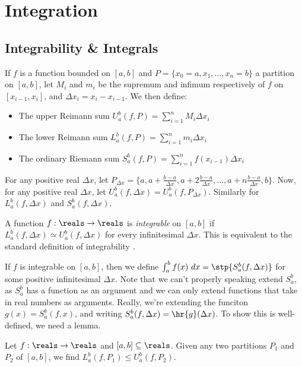 \section{Integration}


\subsection{Integrability \& Integrals}
If $f$ is a function bounded on $[a, b]$ and $P = \{x_0 = a, x_1, \ldots, x_n = b\}$ a partition on $[a, b]$, let $M_i$ and $m_i$ be the supremum and infimum respectively of $f$ on $[x_{i-1}, x_i]$, and $\Delta x_i = x_i - x_{i-1}$. We then define:
\begin{itemize}
    \item The upper Reimann sum $U_a^b(f, P) = \sum_{i=1}^n M_i\Delta x_i$
    \item The lower Reimann sum $L_a^b(f, P) =\sum_{i=1}^n m_i\Delta x_i$
    \item The ordinary Riemann sum $S_a^b(f, P) = \sum_{i=1}^n f(x_{i-1})\Delta x_i$
\end{itemize}
For any positive real $\Delta x$, let $P_{\Delta x} = \{a, a+\frac{b-a}{\Delta x}, a + 2\frac{b-a}{\Delta x}, \ldots, a + n\frac{b-a}{\Delta x}, b\}$. Now, for any positive real $\Delta x$, let $U_a^b(f, \Delta x) = U_a^b(f, P_{\Delta x})$. Similarly for $L_a^b(f, \Delta x)$ and $S_a^b(f, \Delta x)$.

A function $f: \reals \to \reals$ is \textit{integrable} on $[a, b]$ if $L_a^b(f, \Delta x) \simeq U_a^b(f, \Delta x)$ for every infinitesimal $\Delta x$. This is equivalent to the standard definition of integrability \cite[110]{goldblatt1998}.

If $f$ is integrable on $[a, b]$, then we define $\int_a^b f(x)\ dx = \stp{S_a^b(f, \Delta x)}$ for some positive infinitesimal $\Delta x$. Note that we can't properly speaking extend $S_a^b$, as $S_a^b$ has a function as an argument and we can only extend functions that take in real numbers as arguments. Really, we're extending the funciton $g(x) = S_a^b (f, x)$, and writing $S_a^b (f, \Delta x) = \hr{g}(\Delta x)$. To show this is well-defined, we need a lemma.

\begin{lemma}
    Let $f: \reals \to \reals$ and $[a, b] \subseteq \reals$. Given any two partitions $P_1$ and $P_2$ of $[a, b]$, we find $L_a^b(f, P_1) \leq U_a^b(f, P_2)$.
\end{lemma}

